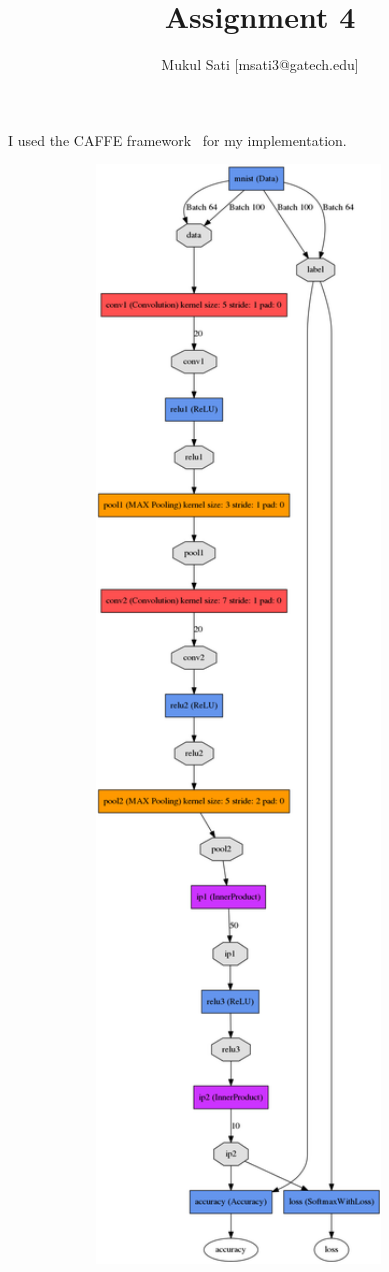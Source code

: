 \documentclass[5pt]{article}
\begin{document}
\title{Assignment 4}
\author{Mukul Sati [msati3@gatech.edu]}
\maketitle

I used the CAFFE framework~\cite{jia2014caffe} for my implementation.

\begin{figure}[T]
  \centering{}
  \includegraphics[width=0.9\textwidth]{images/mnist_arch1.png}

\end{figure}
\end{document}
